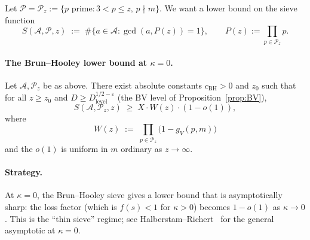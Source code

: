Let $\mathcal{P} = \mathcal{P}_{z} := \{p \text{ prime} : 3 < p \leq z,
\, p \nmid m\}$. We want a lower bound on the sieve function
\begin{equation}\label{eq:S-defn}
  S(\mathcal{A}, \mathcal{P}, z) \;:=\;
    \#\{ a \in \mathcal{A} : \gcd(a, P(z)) = 1 \},
    \qquad P(z) := \prod_{p \in \mathcal{P}_{z}} p.
\end{equation}

\paragraph{The Brun--Hooley lower bound at $\kappa = 0$.}

\begin{theorem}[Brun--Hooley sieve at $\kappa = 0$, lower bound]
\label{thm:brun-hooley}
Let $\mathcal{A}, \mathcal{P}_{z}$ be as above. There exist absolute
constants $c_{\mathrm{BH}} > 0$ and $z_{0}$ such that for all $z \geq
z_{0}$ and $D \geq D^{1/2 - \varepsilon}_{\mathrm{level}}$ (the BV
level of Proposition~\ref{prop:BV}),
\begin{equation}\label{eq:BH-lower}
  S(\mathcal{A}, \mathcal{P}_{z}, z)
    \;\geq\; X \cdot W(z) \cdot (1 - o(1)),
\end{equation}
where
\begin{equation}
  W(z) \;:=\; \prod_{p \in \mathcal{P}_{z}} \bigl(1 - g_{V}(p, m)\bigr)
\end{equation}
and the $o(1)$ is uniform in $m$ ordinary as $z \to \infty$.
\end{theorem}

\paragraph{Strategy.}
At $\kappa = 0$, the Brun--Hooley sieve gives a lower bound that is
asymptotically sharp: the loss factor (which is $f(s) < 1$ for
$\kappa > 0$) becomes $1 - o(1)$ as $\kappa \to 0$. This is the
``thin sieve'' regime; see Halberstam--Richert~\cite[Ch.~II, eq.~(2.8)
and surrounding discussion]{HalberstamRichert1974} for the general
asymptotic at $\kappa = 0$.

